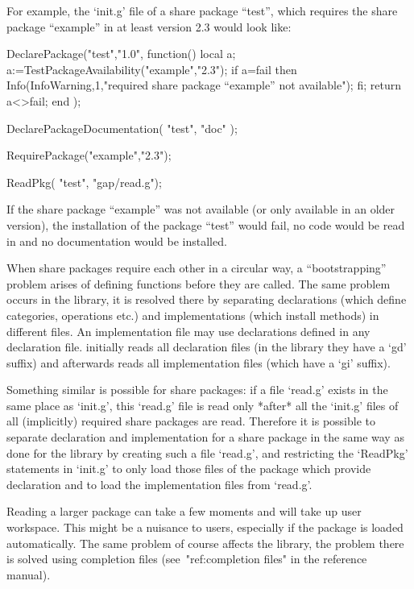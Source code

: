 For example, the `init.g' file of a share package ``test'', which requires
the share package ``example'' in at least version 2.3 would look like:

\begintt
DeclarePackage("test","1.0",
  function()
  local a;
    a:=TestPackageAvailability("example","2.3");
    if a=fail then
      Info(InfoWarning,1,"required share package ``example'' not available");
    fi;
    return a<>fail;
  end
  );

DeclarePackageDocumentation( "test", "doc" );

RequirePackage("example","2.3");

ReadPkg( "test", "gap/read.g");
\endtt

If the share package ``example'' was not available (or only available in an
older version), the installation of the package ``test'' would fail, no code
would be read in and no documentation would be installed.


When  share   packages  require  each other    in  a  circular  way, a
``bootstrapping'' problem arises of defining functions before they are
called. The same  problem occurs in the  library, it is resolved there
by separating declarations (which  define categories, operations etc.)
and   implementations (which install methods)   in different files. An
implementation  file may use   declarations defined in any declaration
file.   {\GAP} initially reads all  declaration  files (in the library
they have a `gd' suffix) and afterwards reads all implementation files
(which have a `gi' suffix).

Something similar  is possible for  share packages: if a file `read.g'
exists in the same place as `init.g',  this `read.g' file is read only
*after*  all  the `init.g' files   of  all (implicitly) required share
packages  are read.  Therefore  it is possible to separate declaration
and implementation for a share package in the same way as done for the
library  by  creating  such  a file   `read.g',   and restricting  the
`ReadPkg' statements  in  `init.g' to  only load   those  files of the
package which provide declaration and to load the implementation files
from `read.g'.


Reading a larger package can take a few moments and will take up user
workspace. This might be a nuisance to users, especially if the package is
loaded automatically.
The same problem of course affects the library, the problem there is solved
using completion files (see~"ref:completion files" in the reference manual).

